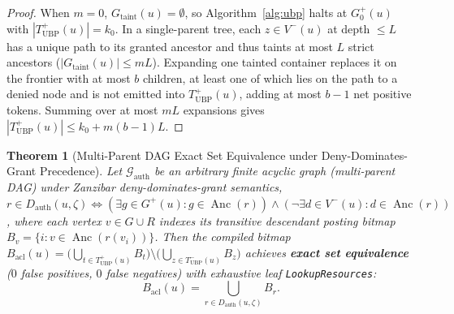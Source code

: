 \documentclass[conference]{IEEEtran}
\newtheorem{theorem}{Theorem}
\begin{document}
\begin{proof}
When $m=0$, $G_{\text{taint}}(u) = \emptyset$, so Algorithm~\ref{alg:ubp} halts at $G_0^+(u)$ with $|T_{\text{UBP}}^+(u)| = k_0$. In a single-parent tree, each $z \in V^-(u)$ at depth $\le L$ has a unique path to its granted ancestor and thus taints at most $L$ strict ancestors ($|G_{\text{taint}}(u)| \le mL$). Expanding one tainted container replaces it on the frontier with at most $b$ children, at least one of which lies on the path to a denied node and is not emitted into $T_{\text{UBP}}^+(u)$, adding at most $b-1$ net positive tokens. Summing over at most $mL$ expansions gives $|T_{\text{UBP}}^+(u)| \le k_0 + m(b-1)L$.
\end{proof}

\begin{theorem}[Multi-Parent DAG Exact Set Equivalence under Deny-Dominates-Grant Precedence]
\label{thm:ubp_dag_exactness}
Let $\mathcal{G}_{\text{auth}}$ be an arbitrary finite acyclic graph (multi-parent DAG) under Zanzibar deny-dominates-grant semantics, $r \in D_{\text{auth}}(u, \zeta) \iff (\exists g \in G^+(u): g \in \operatorname{Anc}(r)) \land (\neg\exists d \in V^-(u): d \in \operatorname{Anc}(r))$, where each vertex $v \in G \cup R$ indexes its transitive descendant posting bitmap $B_v = \{i : v \in \operatorname{Anc}(r(v_i))\}$. Then the compiled bitmap $B_{\text{acl}}(u) = \big(\bigcup_{t \in T_{\text{UBP}}^+(u)} B_t\big) \setminus \big(\bigcup_{z \in T_{\text{UBP}}^-(u)} B_z\big)$ achieves \textbf{exact set equivalence} ($0$ false positives, $0$ false negatives) with exhaustive leaf \texttt{LookupResources}:
\begin{equation}
\label{eq:ubp_exactness}
B_{\text{acl}}(u) = \bigcup_{r \in D_{\text{auth}}(u, \zeta)} B_r.
\end{equation}
\end{theorem}
\end{document}
